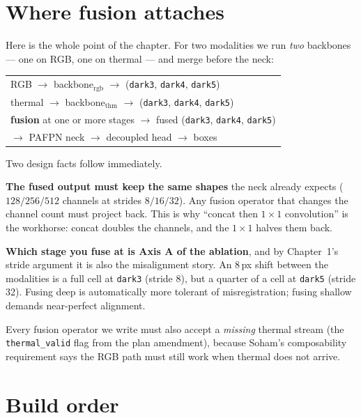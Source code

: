 \documentclass[../main.tex]{subfiles}
\begin{document}
\section{Where fusion attaches}

Here is the whole point of the chapter. For two modalities we run \emph{two} backbones --- one on
RGB, one on thermal --- and merge before the neck:

\begin{center}
\begin{tabular}{l}
\toprule
RGB $\rightarrow$ backbone$_\text{rgb}$ $\rightarrow$ (\texttt{dark3}, \texttt{dark4}, \texttt{dark5}) \\
thermal $\rightarrow$ backbone$_\text{thm}$ $\rightarrow$ (\texttt{dark3}, \texttt{dark4}, \texttt{dark5}) \\
\midrule
\textbf{fusion} at one or more stages $\rightarrow$ fused (\texttt{dark3}, \texttt{dark4}, \texttt{dark5}) \\
\midrule
$\rightarrow$ PAFPN neck $\rightarrow$ decoupled head $\rightarrow$ boxes \\
\bottomrule
\end{tabular}
\end{center}

Two design facts follow immediately.

\textbf{The fused output must keep the same shapes} the neck already expects
($128/256/512$ channels at strides $8/16/32$). Any fusion operator that changes the channel count
must project back. This is why ``concat then $1\times1$ convolution'' is the workhorse: concat
doubles the channels, and the $1\times1$ halves them back.

\textbf{Which stage you fuse at is Axis A of the ablation}, and by Chapter~1's stride argument it
is also the misalignment story. An 8\,px shift between the modalities is a full cell at
\texttt{dark3} (stride 8), but a quarter of a cell at \texttt{dark5} (stride 32). Fusing deep is
automatically more tolerant of misregistration; fusing shallow demands near-perfect alignment.

Every fusion operator we write must also accept a \emph{missing} thermal stream (the
\texttt{thermal\_valid} flag from the plan amendment), because Soham's composability requirement
says the RGB path must still work when thermal does not arrive.

\section{Build order}
\end{document}
